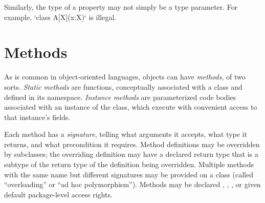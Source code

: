 Similarly, 
the type of a property may not simply be a type parameter.  
For example, \xcd`class A[X](x:X){}` is illegal.





\section{Methods}
\label{sect:Methods}

As is common in object-oriented languages, objects can have {\em methods}, of
two sorts.  {\em Static methods} are functions, conceptually associated with a
class and defined in its namespace.  {\em Instance methods} are parameterized
code bodies associated with an instance of the class, which execute with
convenient access to that instance's fields. 

Each method has a {\em signature}, telling what arguments it accepts, what
type it returns, and what precondition it requires. Method definitions may be
overridden by subclasses; the overriding definition may have a declared return
type that is a subtype of the return type of the definition being overridden.
Multiple methods with the same name but different signatures may be provided
on a class (called ``overloading'' or ``ad hoc polymorphism''). Methods may be
declared , , , or given default package-level access
rights.

